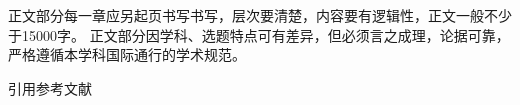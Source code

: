 \xiaosi\song

正文部分每一章应另起页书写书写，层次要清楚，内容要有逻辑性，正文一般不少于15000字。
正文部分因学科、选题特点可有差异，但必须言之成理，论据可靠，严格遵循本学科国际通行的学术规范。

引用参考文献
\cite{zzhml}{}